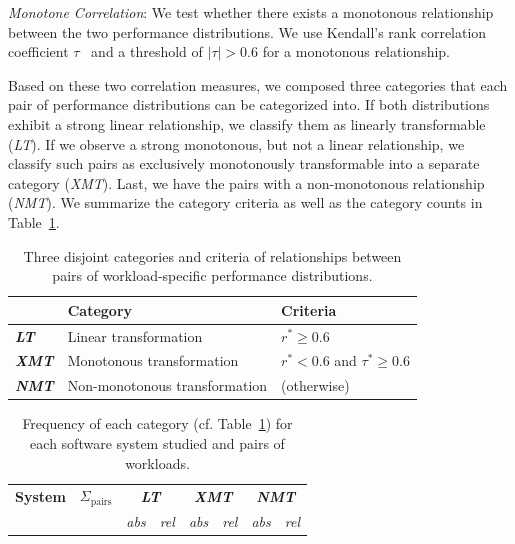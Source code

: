 {\begin{compactenum}
	\item \textit{Monotone Correlation}: We test whether there exists a monotonous relationship between the two performance distributions. We use Kendall's rank correlation coefficient $\tau$~\cite{kendall1938new} and a threshold of  $\vert\tau\vert > 0.6$ for a monotonous relationship.
\end{compactenum}
{\color{black}Based on these two correlation measures, we composed three categories that each pair of performance distributions can be categorized into.
If both distributions exhibit a strong linear relationship, we classify them as linearly transformable (\textit{\colorbox{lt-color}{LT}}). If we observe a strong monotonous, but not a linear relationship, we classify such pairs as exclusively monotonously transformable into a separate category (\textit{\colorbox{xmt-color}{XMT}}). Last, we have the pairs with a non-monotonous relationship  (\textit{\colorbox{nmt-color}{NMT}}). 
We summarize the category criteria as well as the category counts in Table~\ref{tab:categorization}. 

\begin{table}
	\footnotesize
	\caption{Three disjoint categories and criteria of relationships between pairs of workload-specific performance distributions.}
	\centering
\begin{tabular}{lp{4.1cm}p{2.8cm}}	
	\toprule
	 \textbf{} & \textbf{Category} & \textbf{Criteria}\\
	 \midrule
	 \rowcolor{lt-color!40!white}\cellcolor{lt-color}\textit{\textbf{LT}} & {Linear transformation} & $r^* \geq 0.6$ \\
	\rowcolor{xmt-color!40!white}\cellcolor{xmt-color}\textit{\textbf{XMT}} & {Monotonous transformation} & $r^* < 0.6 $ and $ \tau^* \geq 0.6$ \\
	\rowcolor{nmt-color!40!white}\cellcolor{nmt-color}\textit{\textbf{NMT}} & {Non-monotonous transformation}  & (otherwise) \\%
	\bottomrule
\end{tabular}
\label{tab:categorization}
\end{table}

\begin{table}
	\footnotesize
	\centering
	\caption{Frequency of each category (cf. Table~\ref{tab:categorization}) for each software system studied and pairs of workloads.}
\begin{tabular}{p{1.1cm}rrrrrrr}	
	\toprule
	\textbf{System} & \textbf{$\Sigma_\text{pairs}$} & \multicolumn{2}{c}{\textbf{\cellcolor{lt-color}\textit{LT}}} & \multicolumn{2}{c}{\textbf{\cellcolor{xmt-color}\textit{XMT}}} & \multicolumn{2}{c}{\textbf{\cellcolor{nmt-color}\textit{NMT}}}\\
	  & & \textit{abs} &\textit{rel} & \textit{abs} & \textit{rel}& \textit{abs} & \textit{rel}\\
	\midrule
	

\end{tabular}
\end{table}}}
